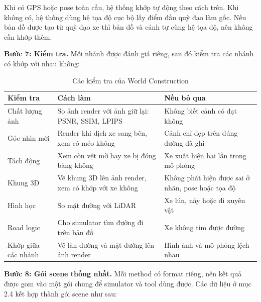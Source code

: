 Khi có GPS hoặc pose toàn cầu, hệ thống khớp tự động theo cách trên.
Khi không có, hệ thống dùng hệ tọa độ cục bộ lấy điểm đầu quỹ đạo làm gốc. Nếu bản đồ được tạo từ quỹ đạo xe thì bản đồ và cảnh tự cùng hệ tọa độ, nên không cần khớp thêm.

\textbf{Bước 7: Kiểm tra.}
Mỗi nhánh được đánh giá riêng, sau đó kiểm tra các nhánh có khớp với nhau không:

\begin{table}[H]
  \centering
  \small
  \caption{Các kiểm tra của World Construction}
  \begin{tabularx}{\linewidth}{>{\raggedright\arraybackslash}p{3cm} >{\raggedright\arraybackslash}X >{\raggedright\arraybackslash}X}
    \toprule
    \textbf{Kiểm tra} & \textbf{Cách làm} & \textbf{Nếu bỏ qua} \\
    \midrule
    Chất lượng ảnh & So ảnh render với ảnh giữ lại: PSNR, SSIM, LPIPS & Không biết cảnh có đạt không \\
    \addlinespace
    Góc nhìn mới & Render khi dịch xe sang bên, xem có méo không & Cảnh chỉ đẹp trên đúng đường đã ghi \\
    \addlinespace
    Tách động & Xem còn vệt mờ hay xe bị đóng băng không & Xe xuất hiện hai lần trong mô phỏng \\
    \addlinespace
    Khung 3D & Vẽ khung 3D lên ảnh render, xem có khớp với xe không & Không phát hiện được sai ở nhãn, pose hoặc tọa độ \\
    \addlinespace
    Hình học & So mặt đường với LiDAR & Xe lún, nảy hoặc đi xuyên vật \\
    \addlinespace
    Road logic & Cho simulator tìm đường đi trên bản đồ & Xe không tìm được đường \\
    \addlinespace
    Khớp giữa các nhánh & Vẽ làn đường và mặt đường lên ảnh render & Hình ảnh và mô phỏng lệch nhau \\
    \bottomrule
  \end{tabularx}
\end{table}

\textbf{Bước 8: Gói scene thống nhất.}
Mỗi method có format riêng, nên kết quả được gom vào một gói chung để simulator và tool dùng được.
Các dữ liệu ở mục 2.4 kết hợp thành gói scene như sau:

